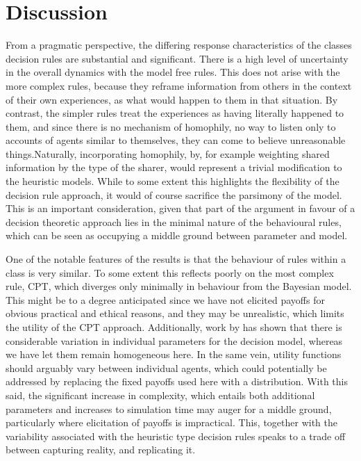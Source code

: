 \section{Discussion}
\label{sec:discussion}
%

From a pragmatic perspective, the differing response characteristics of the classes decision rules are substantial and significant. There is a high level of uncertainty in the overall dynamics with the model free rules. This does not arise with the more complex rules, because they reframe information from others in the context of their own experiences, as what would happen to them in that situation. By contrast, the simpler rules treat the experiences as having literally happened to them, and since there is no mechanism of homophily, no way to listen only to accounts of agents similar to themselves, they can come to believe unreasonable things.Naturally, incorporating homophily, by, for example weighting shared information by the type of the sharer, would represent a trivial modification to the heuristic models. While to some extent this highlights the flexibility of the decision rule approach, it would of course sacrifice the parsimony of the model. This is an important consideration, given that part of the argument in favour of a decision theoretic approach lies in the minimal nature of the behavioural rules, which can be seen as occupying a middle ground between parameter and model.

One of the notable features of the results is that the behaviour of rules within a class is very similar. To some extent this reflects poorly on the most complex rule, \ac{CPT}, which diverges only minimally in behaviour from the Bayesian model. This might be to a degree anticipated since we have not elicited payoffs for obvious practical and ethical reasons, and they may be unrealistic, which limits the utility of the \ac{CPT} approach.  Additionally, work by \citet{Glockner2012} has shown that there is considerable variation in individual parameters for the decision model, whereas we have let them remain homogeneous here. In the same vein, utility functions should arguably vary between individual agents, which could potentially be addressed by replacing the fixed payoffs used here with a distribution.  With this said, the significant increase in complexity, which entails both additional parameters and increases to simulation time may auger for a middle ground, particularly where elicitation of payoffs is impractical.  This, together with the variability associated with the heuristic type decision rules speaks to a trade off between capturing reality, and replicating it.

